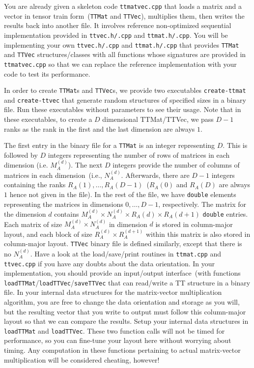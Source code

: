 \documentclass{article}
\begin{document}
You are already given a skeleton code \texttt{ttmatvec.cpp} that loads a matrix and a vector in tensor train form~(\texttt{TTMat} and \texttt{TTVec}), multiplies them, then writes the results back into another file.
It involves reference non-optimized sequential implementation provided in \texttt{ttvec.h/.cpp} and \texttt{ttmat.h/.cpp}.
You will be implementing your own \texttt{ttvec.h/.cpp} and \texttt{ttmat.h/.cpp} that provides \texttt{TTMat} and \texttt{TTVec} structures/classes with all functions whose signatures are provided in \texttt{ttmatvec.cpp} so that we can replace the reference implementation with your code to test its performance.

In order to create \texttt{TTMat}s and \texttt{TTVec}s, we provide two executables \texttt{create-ttmat} and \texttt{create-ttvec} that generate random structures of specified sizes in a binary file.
Run these executables without parameters to see their usage.
Note that in these executables, to create a $D$ dimensional TTMat/TTVec, we pass $D - 1$ ranks as the rank in the first and the last dimension are always $1$.

The first entry in the binary file for a \texttt{TTMat} is an integer representing $D$.
This is followed by $D$ integers representing the number of rows of matrices in each dimension (i.e. $M_A^{(d)}$).
The next $D$ integers provide the number of columns of matrices in each dimension~(i.e., $N_A^{(d)}$.
Afterwards, there are $D - 1$ integers containing the ranks $R_A(1), \dots, R_A(D - 1)$~($R_A(0)$ and $R_A(D)$ are always $1$ hence not given in the file).
In the rest of the file, we have \texttt{double} elements representing the matrices in dimensions $0, \dots, D - 1$, respectively.
The matrix for the dimension $d$ contains $M_A^{(d)} \times N_A^{(d)} \times R_A{(d)} \times R_A{(d + 1)}$ \texttt{double} entries.
Each matrix of size $M_A^{(d)} \times N_A^{(d)}$ in dimension $d$ is stored in column-major layout, and each block of size $R_A^{(d)} \times R_A^{(d + 1)}$ within this matrix is also stored in column-major layout.
\texttt{TTVec} binary file is defined similarly, except that there is no $N_A^{(d)}$.
Have a look at the load/save/print routines in \texttt{ttmat.cpp} and \texttt{ttvec.cpp} if you have any doubts about the data orientation.
In your implementation, you should provide an input/output interface~(with functions \texttt{loadTTMat}/\texttt{loadTTVec}/\texttt{saveTTVec} that can read/write a TT structure in a binary file.
In your internal data structures for the matrix-vector multiplication algorithm, you are free to change the data orientation and storage as you will, but the resulting vector that you write to output must follow this column-major layout so that we can compare the results.
Setup your internal data structures in \texttt{loadTTMat} and \texttt{loadTTVec}.
These two function calls will not be timed for performance, so you can fine-tune your layout here without worrying about timing.
Any computation in these functions pertaining to actual matrix-vector multiplication will be considered cheating, however!
\end{document}
